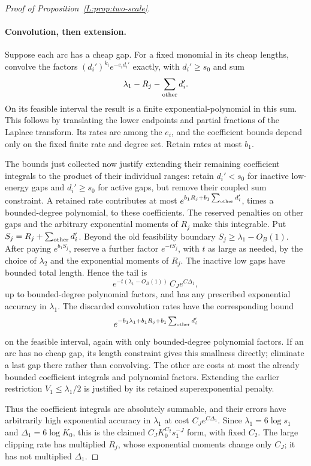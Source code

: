 \begin{proof}[Proof of Proposition~\ref{L:prop:two-scale}]
\paragraph{Convolution, then extension.}
Suppose each arc has a cheap gap. For a fixed monomial in its cheap
lengths, convolve the factors $(d_i')^{k_i}e^{-e_i d_i'}$ exactly,
with $d_i'\ge s_0$ and sum
\[
            \lambda_1-R_j-\sum_{\rm other}d_i'.
\]
On its feasible interval the result is a finite exponential-polynomial
in this sum. This follows by translating the lower endpoints and
partial fractions of the Laplace transform. Its rates are among the
$e_i$, and the coefficient bounds depend only on the fixed finite rate
and degree set. Retain rates at most $b_1$.

The bounds just collected now justify extending their remaining
coefficient integrals to the product of their individual ranges: retain
$d_i'<s_0$ for inactive low-energy gaps and $d_i'\ge s_0$ for active
gaps, but remove their coupled sum constraint. A retained rate contributes
at most $e^{b_1R_j+b_1\sum_{\rm other}d_i'}$, times a bounded-degree
polynomial, to these coefficients. The reserved penalties on other
gaps and the arbitrary exponential moments of $R_j$ make this
integrable. Put $S_j=R_j+\sum_{\rm other}d_i'$. Beyond the old feasibility
boundary $S_j\ge\lambda_1-O_B(1)$. After paying $e^{b_1S_j}$,
reserve a further factor $e^{-tS_j}$, with $t$ as large as needed,
by the choice of $\lambda_2$ and the exponential moments of $R_j$.
The inactive low gaps have bounded total length. Hence the tail is
\[
 e^{-t(\lambda_1-O_B(1))}\,C_J e^{C\Delta_1},
\]
up to bounded-degree polynomial factors, and has any prescribed
exponential accuracy in $\lambda_1$. The discarded convolution rates
have the corresponding bound
\[
       e^{-b_1\lambda_1+b_1R_j+b_1\sum_{\rm other}d_i'}
\]
on the feasible interval, again with only bounded-degree polynomial
factors. If an arc has no cheap gap, its length constraint gives this
smallness directly; eliminate a last gap there rather than convolving.
The other arc costs at most the already bounded coefficient integrals
and polynomial factors. Extending the earlier restriction
$V_1\le\lambda_1/2$ is justified by its retained superexponential
penalty.

Thus the coefficient integrals are absolutely summable, and their
errors have arbitrarily high exponential accuracy in $\lambda_1$ at
cost $C_J e^{C\Delta_1}$. Since
$\lambda_1=6\log s_1$ and $\Delta_1=6\log K_0$, this is the claimed
$C_JK_0^{C_2}s_1^{-J}$ form, with fixed $C_2$. The large clipping rate
has multiplied $R_j$, whose exponential moments change only $C_J$;
it has not multiplied $\Delta_1$.


\end{proof}
